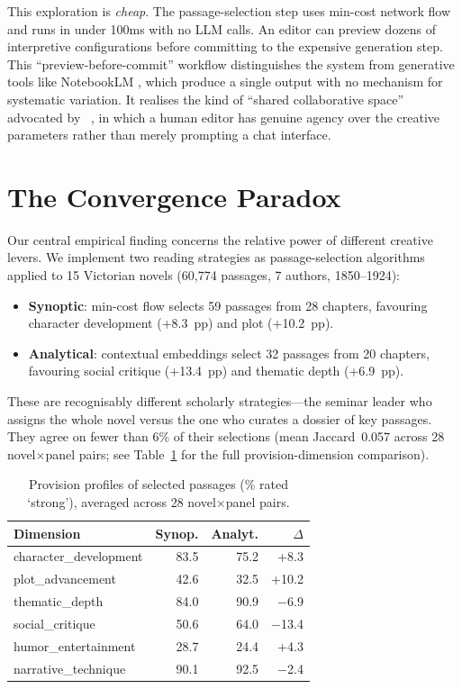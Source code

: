 \documentclass[letterpaper]{article}
\begin{document}
This exploration is \emph{cheap}.  The passage-selection step uses
min-cost network flow \cite{ahuja1993network} and runs in under 100ms
with no LLM calls.  An editor can preview dozens of interpretive
configurations before committing to the expensive generation step.
This ``preview-before-commit'' workflow distinguishes the system from
generative tools like NotebookLM \cite{notebooklm2024}, which produce
a single output with no mechanism for systematic variation.  It
realises the kind of ``shared collaborative space'' advocated by
\citeauthor{ocampo2025beyond}~, in which
a human editor has genuine agency over the creative parameters rather
than merely prompting a chat interface.

\section{The Convergence Paradox}

Our central empirical finding concerns the relative power of different
creative levers.  We implement two reading strategies as
passage-selection algorithms applied to 15 Victorian novels (60,774
passages, 7 authors, 1850--1924):

\begin{itemize}
\item \textbf{Synoptic}: min-cost flow selects 59 passages from 28
chapters, favouring character development (+8.3~pp) and plot (+10.2~pp).
\item \textbf{Analytical}: contextual embeddings select 32 passages
from 20 chapters, favouring social critique (+13.4~pp) and thematic
depth (+6.9~pp).
\end{itemize}

These are recognisably different scholarly strategies---the seminar
leader who assigns the whole novel versus the one who curates a dossier
of key passages.  They agree on fewer than 6\% of their selections
(mean Jaccard~0.057 across 28 novel$\times$panel pairs; see
Table~\ref{tab:convergence_main} for the full provision-dimension
comparison).

\begin{table}[t]
\centering
\small
\caption{Provision profiles of selected passages (\% rated `strong'),
averaged across 28 novel$\times$panel pairs.}
\label{tab:convergence_main}
\begin{tabular}{lrrr}
\toprule
Dimension & Synop. & Analyt. & $\Delta$ \\
\midrule
character\_development & 83.5 & 75.2 & +8.3 \\
plot\_advancement & 42.6 & 32.5 & +10.2 \\
thematic\_depth & 84.0 & 90.9 & $-$6.9 \\
social\_critique & 50.6 & 64.0 & $-$13.4 \\
humor\_entertainment & 28.7 & 24.4 & +4.3 \\
narrative\_technique & 90.1 & 92.5 & $-$2.4 \\
\bottomrule
\end{tabular}
\end{table}
\end{document}
